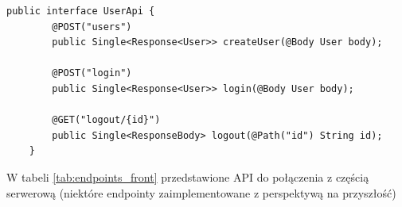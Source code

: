 \begin{lstlisting}[label=list:android_api_user,caption=Plik \texttt{main/java/com/example/testapp/api/api/UserApi.java}.,basicstyle=\tiny\ttfamily]
    public interface UserApi {
        @POST("users")
        public Single<Response<User>> createUser(@Body User body);
    
        @POST("login")
        public Single<Response<User>> login(@Body User body);
    
        @GET("logout/{id}")
        public Single<ResponseBody> logout(@Path("id") String id);
    }
\end{lstlisting}

W tabeli \ref{tab:endpoints_front} przedstawione API do połączenia z częścią serwerową (niektóre endpointy zaimplementowane z perspektywą na przyszłość)
